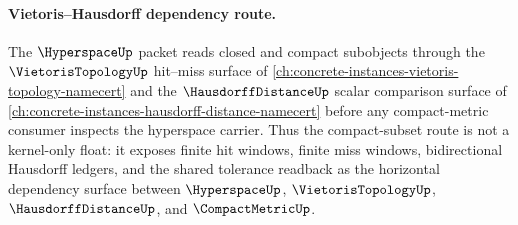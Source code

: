 \paragraph{Vietoris--Hausdorff dependency route.}
The $\HyperspaceUp$ packet reads closed and compact subobjects through the $\VietorisTopologyUp$ hit--miss surface of \autoref{ch:concrete-instances-vietoris-topology-namecert} and the $\HausdorffDistanceUp$ scalar comparison surface of \autoref{ch:concrete-instances-hausdorff-distance-namecert} before any compact-metric consumer inspects the hyperspace carrier. Thus the compact-subset route is not a kernel-only float: it exposes finite hit windows, finite miss windows, bidirectional Hausdorff ledgers, and the shared tolerance readback as the horizontal dependency surface between $\HyperspaceUp$, $\VietorisTopologyUp$, $\HausdorffDistanceUp$, and $\CompactMetricUp$.
